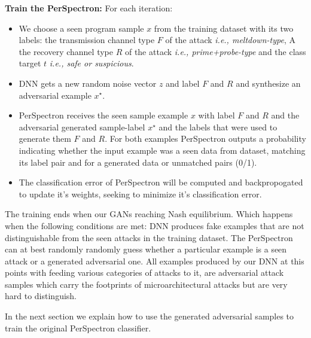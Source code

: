 
\noindent\textbf{Train the PerSpectron:}
For each iteration:

\begin{itemize} [topsep=0pt,parsep=0pt,partopsep=0pt, label={--}, leftmargin=*]
\item We choose a seen program sample $x$ from the training dataset with its two labels: the transmission channel type $F$ of the attack {\em i.e., meltdown-type}, A the recovery channel type $R$ of the attack {\em i.e., prime+probe-type} and the class target $t$ {\em i.e., safe or suspicious}. 
 
\item DNN gets a new random noise vector $z$ and label $F$ and $R$ and  synthesize an adversarial example  $x^{\star}$.
 
\item PerSpectron receives the seen sample example $x$ with label $F$ and $R$ and  the adversarial generated sample-label $x^{\star}$ and the labels that were used to generate them $F$ and $R$. For both examples PerSpectron outputs a probability  indicating whether the input example was a seen data from dataset, matching its label pair and  for a generated data or unmatched pairs (0/1). 
 
\item The classification error of PerSpectron will be computed and backpropogated  to update it's weights, seeking to minimize it's classification error. 
 
\end{itemize}

% 
The training ends when our GANs reaching Nash equilibrium. Which happens when the following conditions are met: DNN produces fake examples that are not distinguishable from the seen attacks in the training dataset. The PerSpectron can at best randomly  randomly guess whether a particular example is a seen attack or a generated adversarial one. All examples produced by our DNN at this points with feeding various categories of attacks to it, are adversarial attack samples which carry the footprints of microarchitectural attacks but are very hard to distinguish. 


In the next section we explain how to use the generated adversarial samples to train the original PerSpectron classifier. 

